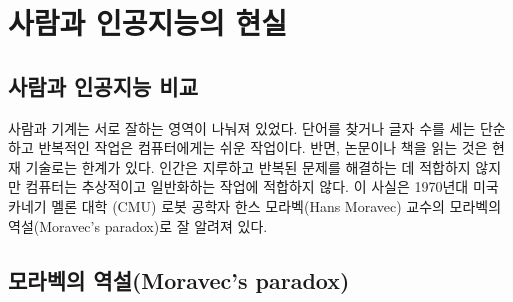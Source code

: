 \documentclass[smallextended]{svjour3}       %
\begin{document}
\hypertarget{human-and-ai-reality}{%
\section{사람과 인공지능의 현실}\label{human-and-ai-reality}}

\hypertarget{human-and-ai-compare}{%
\subsection{사람과 인공지능 비교}\label{human-and-ai-compare}}

\begin{table}[H]
\centering
{}
\end{table}

사람과 기계는 서로 잘하는 영역이 나눠져 있었다. 단어를 찾거나 글자 수를
세는 단순하고 반복적인 작업은 컴퓨터에게는 쉬운 작업이다. 반면, 논문이나
책을 읽는 것은 현재 기술로는 한계가 있다. 인간은 지루하고 반복된 문제를
해결하는 데 적합하지 않지만 컴퓨터는 추상적이고 일반화하는 작업에
적합하지 않다. 이 사실은 1970년대 미국 카네기 멜론 대학 (CMU) 로봇
공학자 한스 모라벡(Hans Moravec) 교수의 모라벡의 역설(Moravec's
paradox)로 잘 알려져 있다.

\hypertarget{uxbaa8uxb77cuxbca1uxc758-uxc5eduxc124moravecs-paradox}{%
\subsection{모라벡의 역설(Moravec's
paradox)}\label{uxbaa8uxb77cuxbca1uxc758-uxc5eduxc124moravecs-paradox}}
\end{document}

